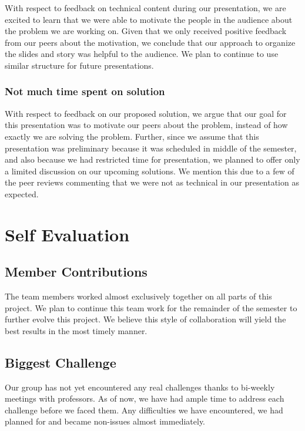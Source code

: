 \documentclass{llcns}
\begin{document}
With respect to feedback on technical content during our presentation, we are excited to learn that we were able to motivate the people in the audience about the problem we are working on.
Given that we only received positive feedback from our peers about the motivation, we conclude that our approach to organize the slides and story was helpful to the audience.
We plan to continue to use similar structure for future presentations.

\subsubsection*{Not much time spent on solution\\}

With respect to feedback on our proposed solution, we argue that our goal for this presentation was to motivate our peers about the problem, instead of how exactly we are solving the problem. 
Further, since we assume that this presentation was preliminary because it was scheduled in middle of the semester, and also because we had restricted time for presentation, we planned to offer only a limited discussion on our upcoming solutions. 
We mention this due to a few of the peer reviews commenting that we were not as technical in our presentation as expected.

\section{Self Evaluation}

\subsection{Member Contributions}

The team members worked almost exclusively together on all parts of this project. We plan to continue this team work for the remainder of the semester to further evolve this project. We believe this style of collaboration will yield the best results in the most timely manner. 

\subsection{Biggest Challenge}

Our group has not yet encountered any real challenges thanks to bi-weekly meetings with professors. As of now, we have had ample time to address each challenge before we faced them. Any difficulties we have encountered, we had planned for and became non-issues almost immediately. 
\end{document}
